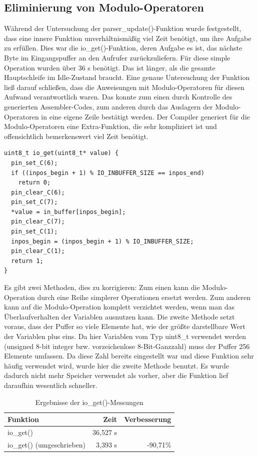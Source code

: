 \subsection{Eliminierung von Modulo-Operatoren}
Während der Untersuchung der parser\_\-update()-Funktion wurde festgestellt, dass eine innere Funktion unverhältnismäßig
viel Zeit benötigt, um ihre Aufgabe zu erfüllen. Dies war die io\_\-get()-Funktion, deren Aufgabe es ist, das nächste Byte
im Eingangspuffer an den Aufrufer zurückzuliefern. Für diese simple Operation wurden über 36 \textmu{}s benötigt.
Das ist länger, als die gesamte Hauptschleife im Idle-Zustand braucht.
Eine genaue Untersuchung der Funktion ließ darauf schließen, dass die Anweisungen
mit Modulo-Operatoren für diesen Aufwand verantwortlich waren. Das konnte zum einen durch Kontrolle des generierten
Assembler-Codes, zum anderen durch das Auslagern der Modulo-Operatoren in eine eigene Zeile bestätigt werden. Der Compiler generiert
für die Modulo-Operatoren eine Extra-Funktion, die sehr kompliziert ist und offensichtlich bemerkenswert viel Zeit benötigt.\\
\begin{verbatim}
uint8_t io_get(uint8_t* value) {
  pin_set_C(6);
  if ((inpos_begin + 1) % IO_INBUFFER_SIZE == inpos_end)
    return 0;
  pin_clear_C(6);
  pin_set_C(7);
  *value = in_buffer[inpos_begin];
  pin_clear_C(7);
  pin_set_C(1);
  inpos_begin = (inpos_begin + 1) % IO_INBUFFER_SIZE;
  pin_clear_C(1);
  return 1;
}
\end{verbatim}
Es gibt zwei Methoden, dies zu korrigieren: Zum einen kann die Modulo-Operation durch eine Reihe simplerer Operationen ersetzt werden.
Zum anderen kann auf die Modulo-Operation komplett verzichtet werden, wenn man das Überlaufverhalten der Variablen ausnutzen kann.
Die zweite Methode setzt voraus, dass der Puffer so viele Elemente hat, wie der größte darstellbare Wert der Variablen plus eins.
Da hier Variablen vom Typ uint8\_t verwendet werden (unsigned 8-bit integer bzw. vorzeichenlose 8-Bit-Ganzzahl) muss der Puffer 256
Elemente umfassen. Da diese Zahl bereits eingestellt war und diese Funktion sehr häufig verwendet wird, wurde hier die zweite Methode
benutzt. Es wurde dadurch nicht mehr Speicher verwendet als vorher, aber die Funktion lief daraufhin wesentlich schneller.
\begin{table}[htb]
\begin{center}
	\begin{tabular}{|l||r|r|}
		\hline
		\textbf{Funktion} & \textbf{Zeit} & \textbf{Verbesserung} \\ \hline \hline
		io\_get() & 36,527 \textmu{}s & \\ \hline
		io\_get() (umgeschrieben) & 3,393 \textmu{}s & -90,71\% \\ \hline
	\end{tabular}
	\caption{\label{io_get} Ergebnisse der io\_get()-Messungen}
\end{center}
\end{table}
